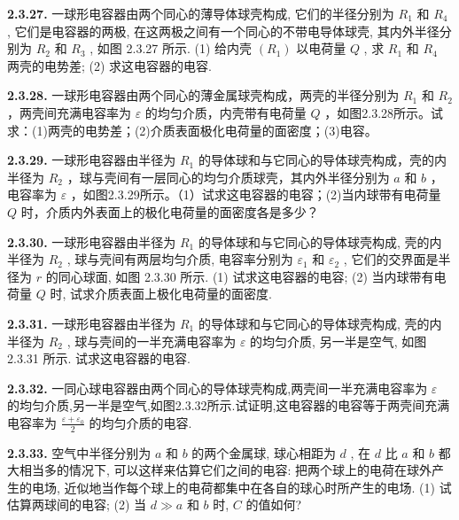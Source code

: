 \vfill
\newpage

\textbf{2.3.27.} 一球形电容器由两个同心的薄导体球壳构成, 它们的半径分别为 $R_{1}$ 和 $R_{4}$ , 它们是电容器的两极, 在这两极之间有一个同心的不带电导体球壳, 其内外半径分别为 $R_{2}$ 和 $R_{3}$ , 如图 2.3.27 所示. (1) 给内壳 $(R_{1})$ 以电荷量 $Q$ , 求 $R_{1}$ 和 $R_{4}$ 两壳的电势差; (2) 求这电容器的电容.

\vfill
\newpage

\textbf{2.3.28.} 一球形电容器由两个同心的薄金属球壳构成，两壳的半径分别为 $R_{1}$ 和 $R_{2}$ ，两壳间充满电容率为 $\varepsilon$ 的均匀介质，内壳带有电荷量 $Q$ ，如图2.3.28所示。试求：(1)两壳的电势差；(2)介质表面极化电荷量的面密度；(3)电容。

\vfill
\newpage

\textbf{2.3.29.} 一球形电容器由半径为 $R_{1}$ 的导体球和与它同心的导体球壳构成，壳的内半径为 $R_{2}$ ，球与壳间有一层同心的均匀介质球壳，其内外半径分别为 $a$ 和 $b$ ，电容率为 $\varepsilon$ ，如图2.3.29所示。（1）试求这电容器的电容；(2)当内球带有电荷量 $Q$ 时，介质内外表面上的极化电荷量的面密度各是多少？

\begin{center}
\end{center}

\vfill
\newpage

\textbf{2.3.30.} 一球形电容器由半径为 $R_{1}$ 的导体球和与它同心的导体球壳构成, 壳的内半径为 $R_{2}$ , 球与壳间有两层均匀介质, 电容率分别为 $\varepsilon_{1}$ 和 $\varepsilon_{2}$ , 它们的交界面是半径为 $r$ 的同心球面, 如图 2.3.30 所示. (1) 试求这电容器的电容; (2) 当内球带有电荷量 $Q$ 时, 试求介质表面上极化电荷量的面密度.

\vfill
\newpage

\textbf{2.3.31.} 一球形电容器由半径为 $R_{1}$ 的导体球和与它同心的导体球壳构成, 壳的内半径为 $R_{2}$ , 球与壳间的一半充满电容率为 $\varepsilon$ 的均匀介质, 另一半是空气, 如图 2.3.31 所示. 试求这电容器的电容.

\vfill
\newpage

\textbf{2.3.32.} 一同心球电容器由两个同心的导体球壳构成,两壳间一半充满电容率为 $\varepsilon$ 的均匀介质,另一半是空气,如图2.3.32所示.试证明,这电容器的电容等于两壳间充满电容率为 $\displaystyle \frac{\varepsilon + \varepsilon_0}{2}$ 的均匀介质的电容.

\vfill
\newpage

\textbf{2.3.33.} 空气中半径分别为 $a$ 和 $b$ 的两个金属球, 球心相距为 $d$ , 在 $d$ 比 $a$ 和 $b$ 都大相当多的情况下, 可以这样来估算它们之间的电容: 把两个球上的电荷在球外产生的电场, 近似地当作每个球上的电荷都集中在各自的球心时所产生的电场. (1) 试估算两球间的电容; (2) 当 $d \gg a$ 和 $b$ 时, $C$ 的值如何?

